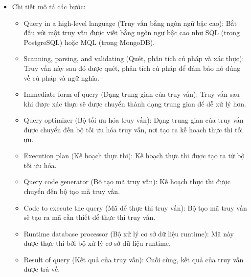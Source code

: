 \begin{itemize}
    \item Chi tiết mô tả các bước:
    \begin{itemize}
        \item Query in a high-level language (Truy vấn bằng ngôn ngữ bậc cao): Bắt đầu với một truy vấn được viết bằng ngôn ngữ bậc cao như SQL (trong PostgreSQL) hoặc MQL (trong MongoDB).
        \item Scanning, parsing, and validating (Quét, phân tích cú pháp và xác thực): Truy vấn này sau đó được quét, phân tích cú pháp để đảm bảo nó đúng về cú pháp và ngữ nghĩa.
        \item Immediate form of query (Dạng trung gian của truy vấn): Truy vấn sau khi được xác thực sẽ được chuyển thành dạng trung gian để dễ xử lý hơn.
        \item Query optimizer (Bộ tối ưu hóa truy vấn): Dạng trung gian của truy vấn được chuyển đến bộ tối ưu hóa truy vấn, nơi tạo ra kế hoạch thực thi tối ưu.
        \item Execution plan (Kế hoạch thực thi): Kế hoạch thực thi được tạo ra từ bộ tối ưu hóa.
        \item Query code generator (Bộ tạo mã truy vấn): Kế hoạch thực thi được chuyển đến bộ tạo mã truy vấn.
        \item Code to execute the query (Mã để thực thi truy vấn): Bộ tạo mã truy vấn sẽ tạo ra mã cần thiết để thực thi truy vấn.
        \item Runtime database processor (Bộ xử lý cơ sở dữ liệu runtime): Mã này được thực thi bởi bộ xử lý cơ sở dữ liệu runtime.
        \item Result of query (Kết quả của truy vấn): Cuối cùng, kết quả của truy vấn được trả về.
    \end{itemize}
\end{itemize}

